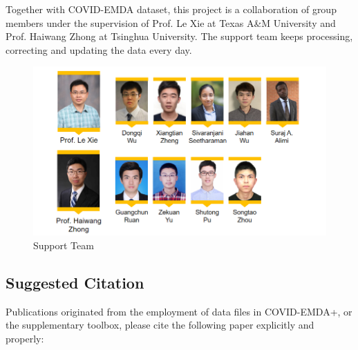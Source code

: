 \documentclass[10pt]{article}
\numberwithin{equation}{section}
\numberwithin{table}{section}
\numberwithin{figure}{section}
\begin{document}
Together with COVID-EMDA dataset, this project is a collaboration of group members under the supervision of Prof. Le Xie at Texas A\&M University and Prof. Haiwang Zhong at Tsinghua University. The support team keeps processing, correcting and updating the data every day.

\begin{figure}[!ht]
    \centering
    \includegraphics[width=.8\textwidth]{figures/contributor-extend-20210408.png}
    \caption{Support Team}
\end{figure}


\clearpage
\subsection{Suggested Citation}
Publications originated from the employment of data files in COVID-EMDA+, or the supplementary toolbox, please cite the following paper explicitly and properly: 
\end{document}
